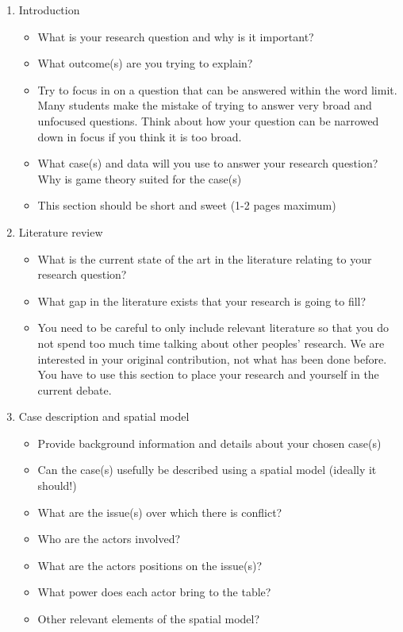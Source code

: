 \documentclass[12pt,a4paper]{article}
\begin{document}
\begin{enumerate}
	\item Introduction
	\begin{itemize}
		\item What is your research question and why is it important?
		\item What outcome(s) are you trying to explain? 
		\item Try to focus in on a question that can be answered within the word limit. Many students make the mistake of trying to answer very broad and unfocused questions. Think about how your question can be narrowed down in focus if you think it is too broad.
		\item What case(s) and data will you use to answer your research question? Why is game theory suited for the case(s)
		\item This section should be short and sweet (1-2 pages maximum)
	\end{itemize}
	\item Literature review
	\begin{itemize}
		\item What is the current state of the art in the literature relating to your research question?
		\item What gap in the literature exists that your research is going to fill?
		\item You need to be careful to only include relevant literature so that you do not spend too much time talking about other peoples' research. We are interested in your original contribution, not what has been done before. You have to use this section to place your research and yourself in the current debate.
	\end{itemize}
	\item Case description and spatial model
	\begin{itemize}
		\item Provide background information and details about your chosen case(s)
		\item Can the case(s) usefully be described using a spatial model (ideally it should!)
		\item What are the issue(s) over which there is conflict?
		\item Who are the actors involved?
		\item What are the actors positions on the issue(s)?
		\item What power does each actor bring to the table?
		\item Other relevant elements of the spatial model?

\end{itemize}
\end{enumerate}
\end{document}
